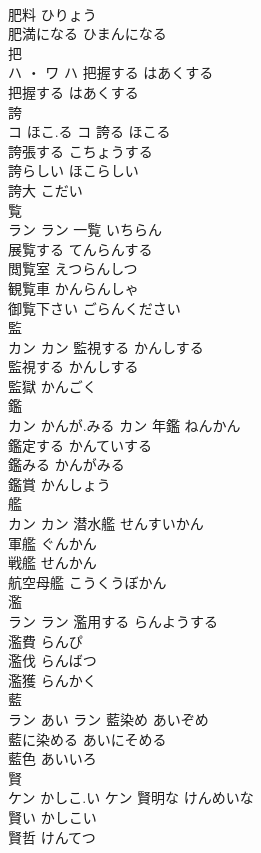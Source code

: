 \documentclass[8pt]{extreport}
\begin{document}
\begin{CJK}{UTF8}{min}
\\	肥料	ひりょう	
\\	肥満になる	ひまんになる	
\\	把	
\\	ハ ・ ワ		ハ	把握する	はあくする	
\\	把握する	はあくする	
\\	誇	
\\	コ	ほこ.る	コ	誇る	ほこる	
\\	誇張する	こちょうする	
\\	誇らしい	ほこらしい	
\\	誇大	こだい	
\\	覧	
\\	ラン		ラン	一覧	いちらん	
\\	展覧する	てんらんする	
\\	閲覧室	えつらんしつ	
\\	観覧車	かんらんしゃ	
\\	御覧下さい	ごらんください	
\\	監	
\\	カン		カン	監視する	かんしする	
\\	監視する	かんしする	
\\	監獄	かんごく	
\\	鑑	
\\	カン	かんが.みる	カン	年鑑	ねんかん	
\\	鑑定する	かんていする	
\\	鑑みる	かんがみる	
\\	鑑賞	かんしょう	
\\	艦	
\\	カン		カン	潜水艦	せんすいかん	
\\	軍艦	ぐんかん	
\\	戦艦	せんかん	
\\	航空母艦	こうくうぼかん	
\\	濫	
\\	ラン		ラン	濫用する	らんようする	
\\	濫費	らんぴ	
\\	濫伐	らんばつ	
\\	濫獲	らんかく	
\\	藍	
\\	ラン	あい	ラン	藍染め	あいぞめ	
\\	藍に染める	あいにそめる	
\\	藍色	あいいろ	
\\	賢	
\\	ケン	かしこ.い	ケン	賢明な	けんめいな	
\\	賢い	かしこい	
\\	賢哲	けんてつ	

\end{CJK}
\end{document}
